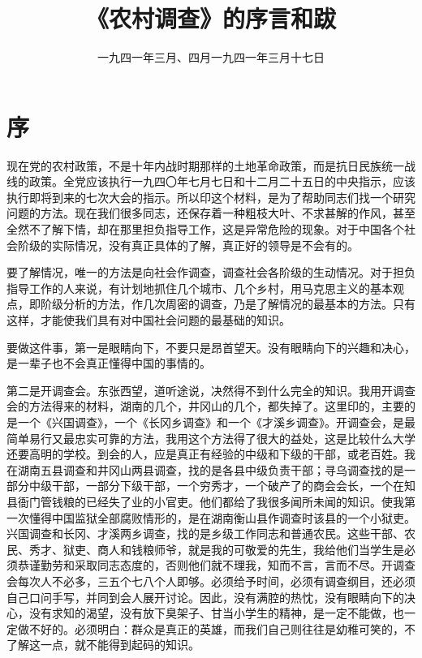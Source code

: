 
\title{《农村调查》的序言和跋}
\date{一九四一年三月、四月}
\maketitle


\date{一九四一年三月十七日}
\section{序}

现在党的农村政策，不是十年内战时期那样的土地革命政策，而是抗日民族统一战线的政策。全党应该执行一九四〇年七月七日和十二月二十五日的中央指示，应该执行即将到来的七次大会的指示。所以印这个材料，是为了帮助同志们找一个研究问题的方法。现在我们很多同志，还保存着一种粗枝大叶、不求甚解的作风，甚至全然不了解下情，却在那里担负指导工作，这是异常危险的现象。对于中国各个社会阶级的实际情况，没有真正具体的了解，真正好的领导是不会有的。

要了解情况，唯一的方法是向社会作调查，调查社会各阶级的生动情况。对于担负指导工作的人来说，有计划地抓住几个城市、几个乡村，用马克思主义的基本观点，即阶级分析的方法，作几次周密的调查，乃是了解情况的最基本的方法。只有这样，才能使我们具有对中国社会问题的最基础的知识。

要做这件事，第一是眼睛向下，不要只是昂首望天。没有眼睛向下的兴趣和决心，是一辈子也不会真正懂得中国的事情的。

第二是开调查会。东张西望，道听途说，决然得不到什么完全的知识。我用开调查会的方法得来的材料，湖南的几个，井冈山的几个，都失掉了。这里印的，主要的是一个《兴国调查》，一个《长冈乡调查》和一个《才溪乡调查》。开调查会，是最简单易行又最忠实可靠的方法，我用这个方法得了很大的益处，这是比较什么大学还要高明的学校。到会的人，应是真正有经验的中级和下级的干部，或老百姓。我在湖南五县调查和井冈山两县调查，找的是各县中级负责干部；寻乌调查找的是一部分中级干部，一部分下级干部，一个穷秀才，一个破产了的商会会长，一个在知县衙门管钱粮的已经失了业的小官吏。他们都给了我很多闻所未闻的知识。使我第一次懂得中国监狱全部腐败情形的，是在湖南衡山县作调查时该县的一个小狱吏。兴国调查和长冈、才溪两乡调查，找的是乡级工作同志和普通农民。这些干部、农民、秀才、狱吏、商人和钱粮师爷，就是我的可敬爱的先生，我给他们当学生是必须恭谨勤劳和采取同志态度的，否则他们就不理我，知而不言，言而不尽。开调查会每次人不必多，三五个七八个人即够。必须给予时间，必须有调查纲目，还必须自己口问手写，并同到会人展开讨论。因此，没有满腔的热忱，没有眼睛向下的决心，没有求知的渴望，没有放下臭架子、甘当小学生的精神，是一定不能做，也一定做不好的。必须明白：群众是真正的英雄，而我们自己则往往是幼稚可笑的，不了解这一点，就不能得到起码的知识。

